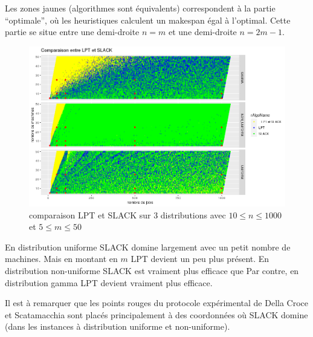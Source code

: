 \documentclass[a4paper,12pt]{report}
\theoremstyle{plain}				%
\theoremstyle{definition}				%
\newcommand{\lp}[1]{\todo[author=LP,color=yellow,inline]{#1}}
\begin{document}
Les zones jaunes (algorithmes sont équivalents) correspondent à la partie ``optimale'', 
  où les heuristiques calculent un makespan égal à l'optimal. Cette partie se situe entre une demi-droite $n=m$ et une demi-droite $n = 2m-1$.   

\begin{figure}
\centering
\includegraphics[width=\columnwidth]{8_comparaison_LPT_SLACK_2D.png}
\caption{comparaison LPT et SLACK sur 3 distributions avec $10\leq n \leq 1000$ et $5\leq m \leq 50$}
\label{fig:resultatComparaisonLPTSLACK}
\end{figure}


En distribution uniforme SLACK domine largement avec 
  un petit nombre de machines. Mais en montant en $m$ LPT devient un peu 
  plus présent.
En distribution non-uniforme SLACK est vraiment plus efficace que
Par contre, en distribution gamma LPT devient vraiment plus efficace.

Il est à remarquer que les points rouges du protocole expérimental de 
  Della Croce et Scatamacchia sont placés principalement à des coordonnées
  où SLACK domine (dans les instances à distribution uniforme et non-uniforme).
\end{document}
